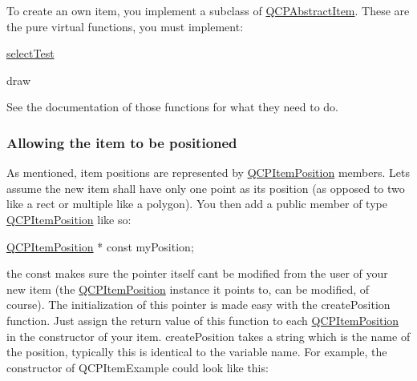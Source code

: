 To create an own item, you implement a subclass of \mbox{\hyperlink{class_q_c_p_abstract_item}{Q\+C\+P\+Abstract\+Item}}. These are the pure virtual functions, you must implement\+: \begin{DoxyItemize}
\item \mbox{\hyperlink{class_q_c_p_abstract_item_ae41d0349d68bb802c49104afd100ba2a}{select\+Test}} \item draw\end{DoxyItemize}
See the documentation of those functions for what they need to do.\hypertarget{class_q_c_p_abstract_item_items-positioning}{}\subsubsection{Allowing the item to be positioned}\label{class_q_c_p_abstract_item_items-positioning}
As mentioned, item positions are represented by \mbox{\hyperlink{class_q_c_p_item_position}{Q\+C\+P\+Item\+Position}} members. Let\textquotesingle{}s assume the new item shall have only one point as its position (as opposed to two like a rect or multiple like a polygon). You then add a public member of type \mbox{\hyperlink{class_q_c_p_item_position}{Q\+C\+P\+Item\+Position}} like so\+:


\begin{DoxyCode}
\mbox{\hyperlink{class_q_c_p_item_position}{QCPItemPosition}} * \textcolor{keyword}{const} myPosition;
\end{DoxyCode}


the const makes sure the pointer itself can\textquotesingle{}t be modified from the user of your new item (the \mbox{\hyperlink{class_q_c_p_item_position}{Q\+C\+P\+Item\+Position}} instance it points to, can be modified, of course). The initialization of this pointer is made easy with the create\+Position function. Just assign the return value of this function to each \mbox{\hyperlink{class_q_c_p_item_position}{Q\+C\+P\+Item\+Position}} in the constructor of your item. create\+Position takes a string which is the name of the position, typically this is identical to the variable name. For example, the constructor of Q\+C\+P\+Item\+Example could look like this\+:


